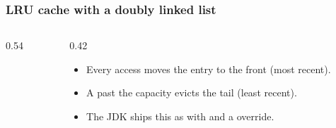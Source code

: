 \documentclass[aspectratio=169,10pt,compress]{beamer}
\begin{document}
\begin{frame}[t,fragile] \frametitle{LRU cache with a doubly linked list}
  \begin{columns}[T]
    \begin{column}{0.54\textwidth}
    \end{column}
    \begin{column}{0.42\textwidth}
      \small
      \begin{itemize}
        \item Every access moves the entry to the front (most recent).
        \item A  past the capacity evicts the tail
              (least recent).
        \item The JDK ships this as  with
               and a  override.
      \end{itemize}
    \end{column}
  \end{columns}
\end{frame}

\end{document}
